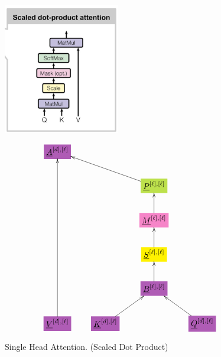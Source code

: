 \begin{figure}[!h]\centering
\begin{minipage}{.5\linewidth}
\includegraphics[width=2in]{transformer/scaled-dot-prod-att.jpg}
\end{minipage}%
\begin{minipage}{.5\linewidth}
$$\xymatrix{
*+[F*:Orchid]{\underline{A}^{[d], [\ell]}}&&&
\\
&&*+[F*:SpringGreen]{\underline{P}^{[\ell], [\ell]}}\ar[ull]&
\\
&&*+[F*:Lavender]{\underline{M}^{[\ell], [\ell]}}\ar[u]&
\\
&&*+[F*:yellow]{\underline{S}^{[\ell],[\ell]}}\ar[u]&
\\
&&*+[F*:Orchid]{\underline{B}^{[\ell], [\ell]}}\ar[u]&
\\
*+[F*:Orchid]{\underline{V}^{[d],[\ell]}}\ar[uuuuu]&*+[F*:Orchid]{\underline{K}^{[d],[\ell]}}\ar[ur]&&*+[F*:Orchid]{\underline{Q}^{[d],[\ell]}}\ar[ul]
}$$
\end{minipage}
\caption{Single Head Attention. (Scaled Dot Product)}
\label{fig-texnn-for-scaled-dot-prod-att}
\end{figure}

